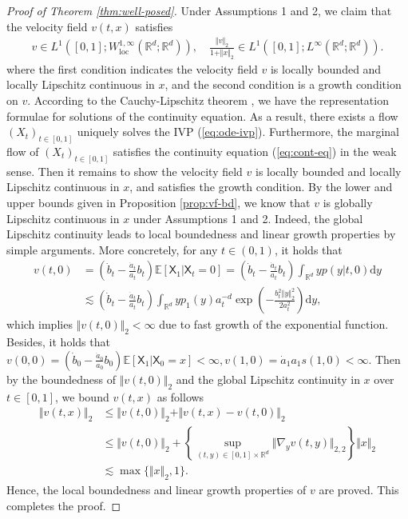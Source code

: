 \documentclass[twoside,11pt]{article}
\def\sR{{\mathbb{R}}}
\newcommand{\E}{\mathbb{E}}
\def\paref#1{(\ref{#1})}
\newcommand{\diff}{\mathrm{d}}
\numberwithin{equation}{section}
\begin{document}
\begin{proof} [Proof of Theorem \ref{thm:well-posed}]
Under Assumptions 1 and 2, we claim that the velocity field $v(t, x)$ satisfies
\begin{align*}
    v \in L^1([0, 1]; W^{1, \infty}_{\mathrm{loc}}(\sR^d; \sR^d)), \quad
    \frac{\Vert v \Vert_2}{1 + \Vert x \Vert_2} \in L^1([0, 1]; L^{\infty}(\sR^d; \sR^d)).
\end{align*}
where the first condition indicates the velocity field $v$ is locally bounded and locally Lipschitz continuous in $x$, and the second condition is a growth condition on $v$.
According to the Cauchy-Lipschitz theorem \cite[Remark 2.4]{ambrosio2014continuity}, we have the representation formulae for solutions of the continuity equation.
As a result, there exists a flow $(X_t)_{t \in [0, 1]}$ uniquely solves the IVP \paref{eq:ode-ivp}.
Furthermore, the marginal flow of $(X_t)_{t \in [0, 1]}$ satisfies the continuity equation \paref{eq:cont-eq} in the weak sense.
Then it remains to show the velocity field $v$ is locally bounded and locally Lipschitz continuous in $x$, and satisfies the growth condition.
By the lower and upper bounds given in Proposition \ref{prop:vf-bd}, we know that $v$ is globally Lipschitz continuous in $x$ under Assumptions 1 and 2. Indeed, the global Lipschitz continuity leads to local boundedness and linear growth properties by simple arguments.
More concretely, for any $t\in (0,1)$, it holds that
\begin{align*}
    v(t, 0)
    &= \left( \dot{b}_t - \frac{\dot{a}_t}{a_t} b_t \right) \E[\mathsf{X}_1 | \mathsf{X}_t = 0]
     = \left( \dot{b}_t - \frac{\dot{a}_t}{a_t} b_t \right) \int_{\mathbb R^d} y p(y | t, 0) \diff y \\
    & \lesssim \left( \dot{b}_t - \frac{\dot{a}_t}{a_t} b_t \right) \int_{\sR^d} y p_1(y) a_t^{-d} \exp \left(- \frac{b_t^2 \Vert y \Vert^2_2}{2 a_t^2} \right) \diff y,
\end{align*}
which implies $\Vert v(t, 0) \Vert_2 < \infty$ due to fast growth of the exponential function.
Besides, it holds that $v(0, 0) = (\dot{b}_0 - \tfrac{\dot{a}_0}{a_0}b_0) \E[\mathsf{X}_1 | \mathsf{X}_0 = x] < \infty, v(1, 0) = \dot{a}_1 a_1 s(1, 0) < \infty$.
Then by the boundedness of $\Vert v(t, 0) \Vert_2$ and the global Lipschitz continuity in $x$ over $t \in [0, 1]$, we bound $v(t, x)$ as follows
\begin{align*}
    \Vert v(t, x) \Vert_2
    & \le \Vert v(t, 0) \Vert_2 + \Vert v(t, x) - v(t, 0) \Vert_2 \\
    & \le \Vert v(t, 0) \Vert_2 + \left\{ \sup_{(t, y) \in [0,1] \times \sR^d} \Vert \nabla_y v(t, y) \Vert_{2,2} \right\} \Vert x \Vert_2 \\
    & \lesssim \max\{ \Vert x \Vert_2, 1 \}.
\end{align*}
Hence, the local boundedness and linear growth properties of $v$ are proved.
This completes the proof.
\end{proof}
\end{document}
